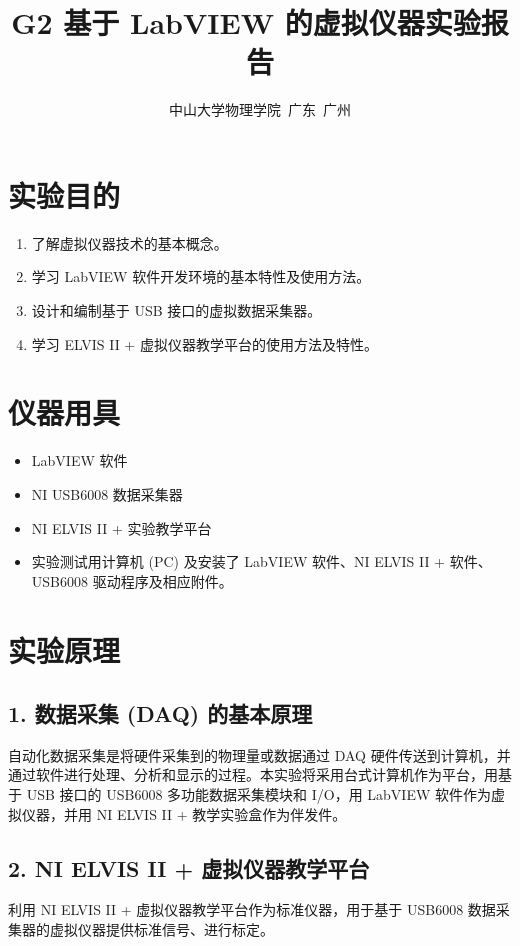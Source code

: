 \documentclass[a4paper,8pt,twocolumn]{article}
\title{
  \textbf{\huge G2 基于 LabVIEW 的虚拟仪器实验报告}}
\author{
\small 中山大学物理学院~广东~广州
}
\begin{document}
\maketitle

\newpage

\section*{实验目的}
\begin{enumerate}
    \item 了解虚拟仪器技术的基本概念。
    \item 学习 LabVIEW 软件开发环境的基本特性及使用方法。
    \item 设计和编制基于 USB 接口的虚拟数据采集器。
    \item 学习 ELVIS II + 虚拟仪器教学平台的使用方法及特性。
\end{enumerate}

\section*{仪器用具}
\begin{itemize}
    \item LabVIEW 软件
    \item NI USB6008 数据采集器
    \item NI ELVIS II + 实验教学平台
    \item 实验测试用计算机 (PC) 及安装了 LabVIEW 软件、NI ELVIS II + 软件、USB6008 驱动程序及相应附件。
\end{itemize}

\section*{实验原理}
\subsection*{1. 数据采集 (DAQ) 的基本原理}
自动化数据采集是将硬件采集到的物理量或数据通过 DAQ 硬件传送到计算机，并通过软件进行处理、分析和显示的过程。本实验将采用台式计算机作为平台，用基于 USB 接口的 USB6008 多功能数据采集模块和 I/O，用 LabVIEW 软件作为虚拟仪器，并用 NI ELVIS II + 教学实验盒作为伴发件。

\subsection*{2. NI ELVIS II + 虚拟仪器教学平台}
利用 NI ELVIS II + 虚拟仪器教学平台作为标准仪器，用于基于 USB6008 数据采集器的虚拟仪器提供标准信号、进行标定。
\end{document}
